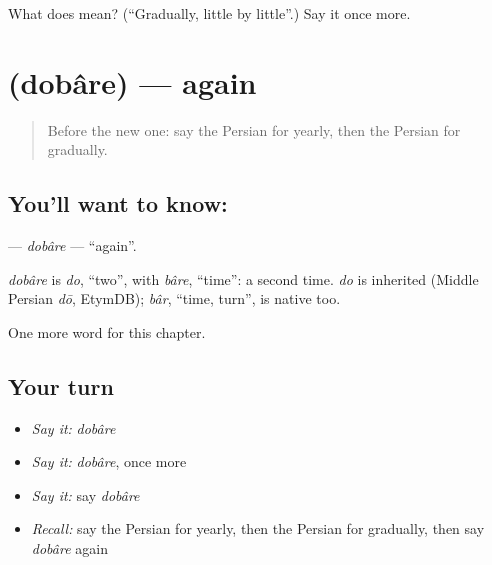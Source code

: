 \begin{tcolorbox}[breakable,colback=teal!4,colframe=teal!35!black,title={Before you move on}]
What does   mean? (\textquotedblleft{}Gradually, little by little\textquotedblright{}.) Say it once more.
\end{tcolorbox}
\section[\texorpdfstring{\fa{دوباره} (dobâre)}{دوباره (dobâre)}]{ (dobâre) — again}

\label{lesson:FA-C192-dobare}



\begin{quote}
Before the new one: say the Persian for yearly, then the Persian for gradually.
\end{quote}

\subsection*{You'll want to know: }
\textbf{} — \emph{dobâre} — \textquotedblleft{}again\textquotedblright{}.

\begin{cousinweb}
\emph{dobâre} is \emph{do}, \textquotedblleft{}two\textquotedblright{}, with \emph{bâre}, \textquotedblleft{}time\textquotedblright{}: a second time. \emph{do} is inherited (Middle Persian \emph{dō}, EtymDB); \emph{bâr}, \textquotedblleft{}time, turn\textquotedblright{}, is native too.
\end{cousinweb}

\begin{grammarlens}[title={What you've built}]
One more word for this chapter.
\end{grammarlens}

\subsection*{Your turn}
\begin{itemize}
\raggedright
  \item \emph{Say it:} \emph{dobâre}
  \item \emph{Say it:} \emph{dobâre}, once more
  \item \emph{Say it:} say \emph{dobâre}
  \item \emph{Recall:} say the Persian for yearly, then the Persian for gradually, then say \emph{dobâre} again
\end{itemize}

